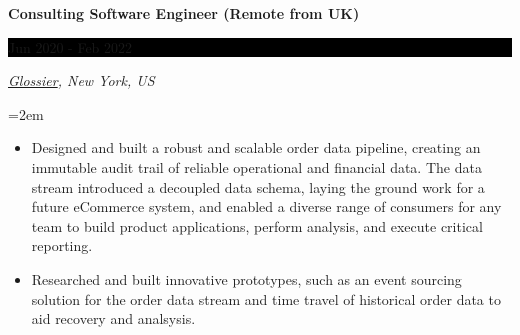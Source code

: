 \documentclass[paper=a4,fontsize=11pt]{scrartcl} %
\newcommand{\EducationEntry}[4]{
    \noindent \textbf{#1} \hfill        %
    \colorbox{Black}{
      \parbox{8.5em}{
      \hfill\color{White}#2}} \par      %
    \noindent \textit{#3} \par          %
    \noindent\hangindent=2em\hangafter=0 \small #4 %
    \normalsize \par}
\newcommand{\WorkEntry}[4]{             %
    \noindent \textbf{#1} \hfill        %
    \colorbox{Black}{%
      \parbox{9em}{%
      \hfill\color{White}#2}} \par      %
        \noindent \textit{#3} \par      %
    \noindent\hangindent=2em\hangafter=0 \small #4 %
    \normalsize \par}
\begin{document}
\WorkEntry{Consulting Software Engineer (Remote from UK)}{Jun 2020 - Feb 2022}
{\href{https://www.glossier.com}{Glossier}, New York, US}
{
  \begin{itemize} \itemsep -1pt
    \item Designed and built a robust and scalable order data pipeline,
          creating an immutable audit trail of reliable operational and financial data.
          The data stream introduced a decoupled data schema, laying the ground work
          for a future eCommerce system, and enabled a diverse range of consumers
          for any team to build product applications, perform analysis, and execute critical reporting.
    \item Researched and built innovative prototypes, such as an event sourcing solution for the order
          data stream and time travel of historical order data to aid recovery and analsysis.

\end{itemize}}
\end{document}
